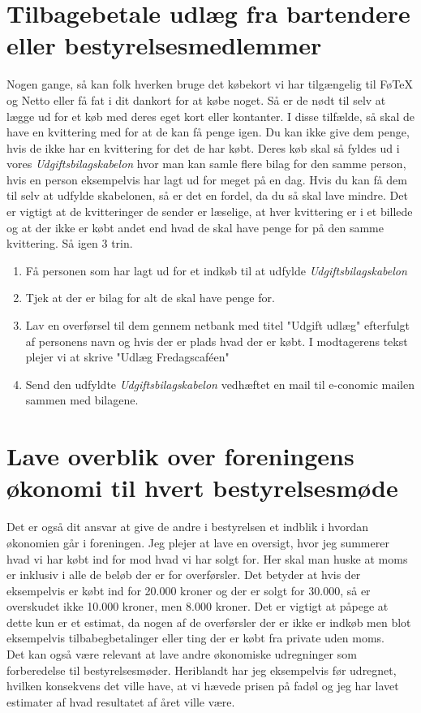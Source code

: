 \section{Tilbagebetale udlæg fra bartendere eller bestyrelsesmedlemmer}
Nogen gange, så kan folk hverken bruge det købekort vi har tilgængelig til FøTeX og Netto eller få fat i dit dankort for at købe noget. Så er de nødt til selv at lægge ud for et køb med deres eget kort eller kontanter. I disse tilfælde, så skal de have en kvittering med for at de kan få penge igen. Du kan ikke give dem penge, hvis de ikke har en kvittering for det de har købt. Deres køb skal så fyldes ud i vores \textit{Udgiftsbilagskabelon} hvor man kan samle flere bilag for den samme person, hvis en person eksempelvis har lagt ud for meget på en dag. Hvis du kan få dem til selv at udfylde skabelonen, så er det en fordel, da du så skal lave mindre. Det er vigtigt at de kvitteringer de sender er læselige, at hver kvittering er i et billede og at der ikke er købt andet end hvad de skal have penge for på den samme kvittering. Så igen 3 trin.
\begin{enumerate}
    \item Få personen som har lagt ud for et indkøb til at udfylde \textit{Udgiftsbilagskabelon}
    \item Tjek at der er bilag for alt de skal have penge for.
    \item Lav en overførsel til dem gennem netbank med titel "Udgift udlæg" efterfulgt af personens navn og hvis der er plads hvad der er købt. I modtagerens tekst plejer vi at skrive "Udlæg Fredagscaféen"
    \item Send den udfyldte \textit{Udgiftsbilagskabelon} vedhæftet en mail til e-conomic mailen sammen med bilagene.
\end{enumerate}

\section{Lave overblik over foreningens økonomi til hvert bestyrelsesmøde}
Det er også dit ansvar at give de andre i bestyrelsen et indblik i hvordan økonomien går i foreningen. Jeg plejer at lave en oversigt, hvor jeg summerer hvad vi har købt ind for mod hvad vi har solgt for. Her skal man huske at moms er inklusiv i alle de beløb der er for overførsler. Det betyder at hvis der eksempelvis er købt ind for 20.000 kroner og der er solgt for 30.000, så er overskudet ikke 10.000 kroner, men 8.000 kroner. Det er vigtigt at påpege at dette kun er et estimat, da nogen af de overførsler der er ikke er indkøb men blot eksempelvis tilbabegbetalinger eller ting der er købt fra private uden moms.\\
Det kan også være relevant at lave andre økonomiske udregninger som forberedelse til bestyrelsesmøder. Heriblandt har jeg eksempelvis før udregnet, hvilken konsekvens det ville have, at vi hævede prisen på fadøl og jeg har lavet estimater af hvad resultatet af året ville være.

